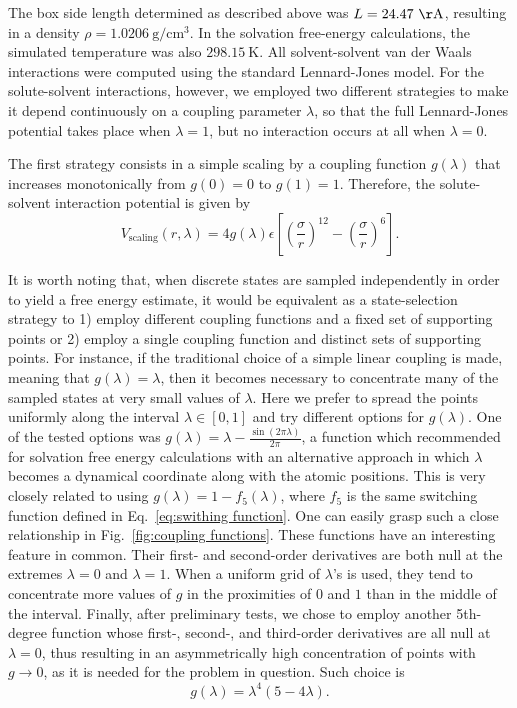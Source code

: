 \documentclass[
aip,
jcp,
reprint,
]{revtex4-1}
\begin{document}
The box side length determined as described above was $L = 24.47~\mathrm{\AA}$, resulting in a density $\rho = 1.0206~\mathrm{g/cm^3}$.
In the solvation free-energy calculations, the simulated temperature was also $298.15~\mathrm{K}$.
All solvent-solvent van der Waals interactions were computed using the standard Lennard-Jones model.
For the solute-solvent interactions, however, we employed two different strategies to make it depend continuously on a coupling parameter $\lambda$, so that the full Lennard-Jones potential takes place when $\lambda = 1$, but no interaction occurs at all when $\lambda = 0$.

The first strategy consists in a simple scaling by a coupling function $g(\lambda)$ that increases monotonically from $g(0) = 0$ to $g(1) = 1$.
Therefore, the solute-solvent interaction potential is given by
\begin{equation*}
V_\mathrm{scaling}(r,\lambda) = 4 g(\lambda) \epsilon \left[\left(\frac{\sigma}{r}\right)^{12} - \left(\frac{\sigma}{r}\right)^6\right].
\end{equation*}

It is worth noting that, when discrete states are sampled independently in order to yield a free energy estimate, it would be equivalent as a state-selection strategy to 1) employ different coupling functions and a fixed set of supporting points or 2) employ a single coupling function and distinct sets of supporting points.
For instance, if the traditional choice of a simple linear coupling is made, meaning that $g(\lambda) = \lambda$, then it becomes necessary to concentrate many of the sampled states at very small values of $\lambda$.
Here we prefer to spread the points uniformly along the interval $\lambda \in [0, 1]$ and try different options for $g(\lambda)$.
One of the tested options was  $g(\lambda) = \lambda-\frac{\sin(2\pi\lambda)}{2\pi}$, a function which \citeauthor{Abrams_2006} \cite{Abrams_2006} recommended for solvation free energy calculations with an alternative approach in which $\lambda$ becomes a dynamical coordinate along with the atomic positions.
This is very closely related to using $g(\lambda) = 1 - f_5(\lambda)$, where $f_5$ is the same switching function defined in Eq.~\eqref{eq:swithing function}.
One can easily grasp such a close relationship in Fig.~\ref{fig:coupling functions}.
These functions have an interesting feature in common.
Their first- and second-order derivatives are both null at the extremes $\lambda = 0$ and $\lambda=1$.
When a uniform grid of $\lambda$'s is used, they tend to concentrate more values of $g$ in the proximities of $0$ and $1$ than in the middle of the interval.
Finally, after preliminary tests, we chose to employ another 5th-degree function whose first-, second-, and third-order derivatives are all null at $\lambda=0$, thus resulting in an asymmetrically high concentration of points with $g \to 0$, as it is needed for the problem in question.
Such choice is
\begin{equation}
g(\lambda) = \lambda^4 (5 - 4 \lambda).
\end{equation}
\end{document}
